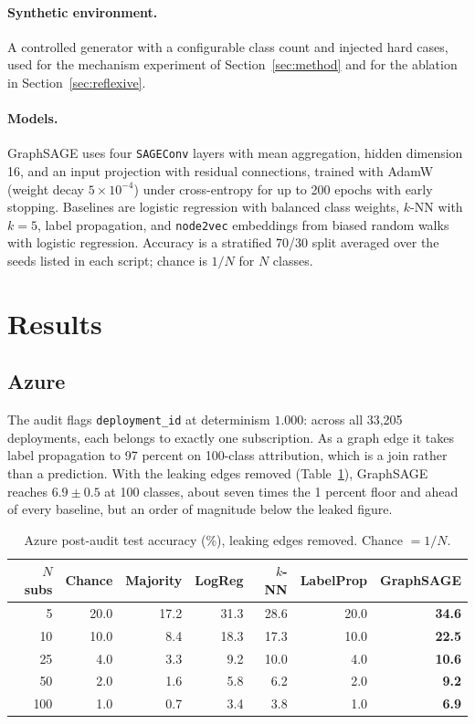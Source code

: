 \documentclass[11pt]{article}
\newcommand{\code}[1]{\texttt{#1}}
\begin{document}
\paragraph{Synthetic environment.} A controlled generator with a configurable
class count and injected hard cases, used for the mechanism experiment of
Section~\ref{sec:method} and for the ablation in Section~\ref{sec:reflexive}.

\paragraph{Models.} GraphSAGE uses four \code{SAGEConv} layers with mean
aggregation, hidden dimension 16, and an input projection with residual
connections, trained with AdamW (weight decay $5\times10^{-4}$) under
cross-entropy for up to 200 epochs with early stopping. Baselines are logistic
regression with balanced class weights, $k$-NN with $k=5$, label propagation,
and \code{node2vec} embeddings from biased random walks
\citep{grover2016node2vec} with logistic regression. Accuracy is a stratified
70/30 split averaged over the seeds listed in each script; chance is $1/N$ for
$N$ classes.

\section{Results}
\label{sec:results}

\subsection{Azure}

The audit flags \code{deployment\_id} at determinism $1.000$: across all
33{,}205 deployments, each belongs to exactly one subscription. As a graph edge
it takes label propagation to 97 percent on 100-class attribution, which is a
join rather than a prediction. With the leaking edges removed
(Table~\ref{tab:azure}), GraphSAGE reaches $6.9\pm0.5$ at 100 classes, about
seven times the 1 percent floor and ahead of every baseline, but an order of
magnitude below the leaked figure.

\begin{table}[h]
\centering
\caption{Azure post-audit test accuracy (\%), leaking edges removed. Chance
$=1/N$.}
\label{tab:azure}
\begin{tabular}{rrrrrrr}
\toprule
$N$ subs & Chance & Majority & LogReg & $k$-NN & LabelProp & \textbf{GraphSAGE} \\
\midrule
5   & 20.0 & 17.2 & 31.3 & 28.6 & 20.0 & \textbf{34.6} \\
10  & 10.0 &  8.4 & 18.3 & 17.3 & 10.0 & \textbf{22.5} \\
25  &  4.0 &  3.3 &  9.2 & 10.0 &  4.0 & \textbf{10.6} \\
50  &  2.0 &  1.6 &  5.8 &  6.2 &  2.0 & \textbf{9.2}  \\
100 &  1.0 &  0.7 &  3.4 &  3.8 &  1.0 & \textbf{6.9}  \\
\bottomrule
\end{tabular}
\end{table}
\end{document}
